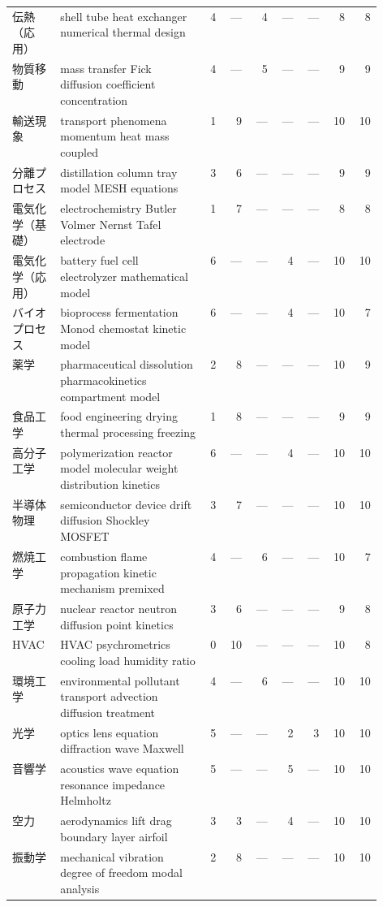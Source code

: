 \begin{footnotesize}
\begin{longtable}{@{}>{\raggedright\arraybackslash}p{0.13\linewidth}>{\raggedright\arraybackslash}p{0.40\linewidth}rrrrrrr@{}}
伝熱（応用） & shell tube heat exchanger numerical thermal design & 4 & --- & 4 & --- & --- & 8 & 8 \\
物質移動 & mass transfer Fick diffusion coefficient concentration & 4 & --- & 5 & --- & --- & 9 & 9 \\
輸送現象 & transport phenomena momentum heat mass coupled & 1 & 9 & --- & --- & --- & 10 & 10 \\
分離プロセス & distillation column tray model MESH equations & 3 & 6 & --- & --- & --- & 9 & 9 \\
電気化学（基礎） & electrochemistry Butler Volmer Nernst Tafel electrode & 1 & 7 & --- & --- & --- & 8 & 8 \\
電気化学（応用） & battery fuel cell electrolyzer mathematical model & 6 & --- & --- & 4 & --- & 10 & 10 \\
バイオプロセス & bioprocess fermentation Monod chemostat kinetic model & 6 & --- & --- & 4 & --- & 10 & 7 \\
薬学 & pharmaceutical dissolution pharmacokinetics compartment model & 2 & 8 & --- & --- & --- & 10 & 9 \\
食品工学 & food engineering drying thermal processing freezing & 1 & 8 & --- & --- & --- & 9 & 9 \\
高分子工学 & polymerization reactor model molecular weight distribution kinetics & 6 & --- & --- & 4 & --- & 10 & 10 \\
半導体物理 & semiconductor device drift diffusion Shockley MOSFET & 3 & 7 & --- & --- & --- & 10 & 10 \\
燃焼工学 & combustion flame propagation kinetic mechanism premixed & 4 & --- & 6 & --- & --- & 10 & 7 \\
原子力工学 & nuclear reactor neutron diffusion point kinetics & 3 & 6 & --- & --- & --- & 9 & 8 \\
HVAC & HVAC psychrometrics cooling load humidity ratio & 0 & 10 & --- & --- & --- & 10 & 8 \\
環境工学 & environmental pollutant transport advection diffusion treatment & 4 & --- & 6 & --- & --- & 10 & 10 \\
光学 & optics lens equation diffraction wave Maxwell & 5 & --- & --- & 2 & 3 & 10 & 10 \\
音響学 & acoustics wave equation resonance impedance Helmholtz & 5 & --- & --- & 5 & --- & 10 & 10 \\
空力 & aerodynamics lift drag boundary layer airfoil & 3 & 3 & --- & 4 & --- & 10 & 10 \\
振動学 & mechanical vibration degree of freedom modal analysis & 2 & 8 & --- & --- & --- & 10 & 10 \\

\end{longtable}
\end{footnotesize}
